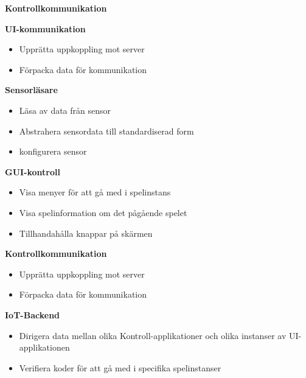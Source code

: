 \begin{labeling}{\small{\textbf{Kontrollkommunikation}}}
    \item [\small{\textbf{UI-kommunikation}}]
        \begin{itemize}
            \item Upprätta uppkoppling mot server
            \item Förpacka data för kommunikation
            \newline
        \end{itemize}

    \item [\small{\textbf{Sensorläsare}}]
        \begin{itemize}
            \item Läsa av data från sensor
            \item Abstrahera sensordata till standardiserad form
            \item konfigurera sensor
            \newline
        \end{itemize}

    \item [\small{\textbf{GUI-kontroll}}]
        \begin{itemize}
            \item Visa menyer för att gå med i spelinstans
            \item Visa spelinformation om det pågående spelet
            \item Tillhandahålla knappar på skärmen
            \newline
        \end{itemize}

    \item [\small{\textbf{Kontrollkommunikation}}]
        \begin{itemize}
            \item Upprätta uppkoppling mot server
            \item Förpacka data för kommunikation
            \newline
        \end{itemize}

    \item [\small{\textbf{IoT-Backend}}]
        \begin{itemize}
            \item Dirigera data mellan olika Kontroll-applikationer och olika instanser av UI-applikationen
            \item Verifiera koder för att gå med i specifika spelinstanser
            \newline
        \end{itemize}
\end{labeling}


